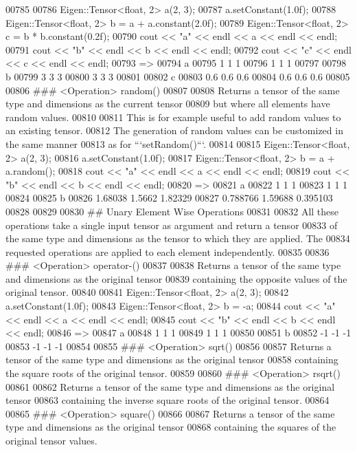\begin{DoxyCode}
00785 
00786     Eigen::Tensor<float, 2> a(2, 3);
00787     a.setConstant(1.0f);
00788     Eigen::Tensor<float, 2> b = a + a.constant(2.0f);
00789     Eigen::Tensor<float, 2> c = b * b.constant(0.2f);
00790     cout << "a" << endl << a << endl << endl;
00791     cout << "b" << endl << b << endl << endl;
00792     cout << "c" << endl << c << endl << endl;
00793     =>
00794     a
00795     1 1 1
00796     1 1 1
00797 
00798     b
00799     3 3 3
00800     3 3 3
00801 
00802     c
00803     0.6 0.6 0.6
00804     0.6 0.6 0.6
00805 
00806 ### <Operation> random()
00807 
00808 Returns a tensor of the same type and dimensions as the current tensor
00809 but where all elements have random values.
00810 
00811 This is for example useful to add random values to an existing tensor.
00812 The generation of random values can be customized in the same manner
00813 as for ```setRandom()```.
00814 
00815     Eigen::Tensor<float, 2> a(2, 3);
00816     a.setConstant(1.0f);
00817     Eigen::Tensor<float, 2> b = a + a.random();
00818     cout << "a" << endl << a << endl << endl;
00819     cout << "b" << endl << b << endl << endl;
00820     =>
00821     a
00822     1 1 1
00823     1 1 1
00824 
00825     b
00826     1.68038   1.5662  1.82329
00827     0.788766  1.59688 0.395103
00828 
00829 
00830 ## Unary Element Wise Operations
00831 
00832 All these operations take a single input tensor as argument and return a tensor
00833 of the same type and dimensions as the tensor to which they are applied.  The
00834 requested operations are applied to each element independently.
00835 
00836 ### <Operation> operator-()
00837 
00838 Returns a tensor of the same type and dimensions as the original tensor
00839 containing the opposite values of the original tensor.
00840 
00841     Eigen::Tensor<float, 2> a(2, 3);
00842     a.setConstant(1.0f);
00843     Eigen::Tensor<float, 2> b = -a;
00844     cout << "a" << endl << a << endl << endl;
00845     cout << "b" << endl << b << endl << endl;
00846     =>
00847     a
00848     1 1 1
00849     1 1 1
00850 
00851     b
00852     -1 -1 -1
00853     -1 -1 -1
00854 
00855 ### <Operation> sqrt()
00856 
00857 Returns a tensor of the same type and dimensions as the original tensor
00858 containing the square roots of the original tensor.
00859 
00860 ### <Operation> rsqrt()
00861 
00862 Returns a tensor of the same type and dimensions as the original tensor
00863 containing the inverse square roots of the original tensor.
00864 
00865 ### <Operation> square()
00866 
00867 Returns a tensor of the same type and dimensions as the original tensor
00868 containing the squares of the original tensor values.

\end{DoxyCode}

